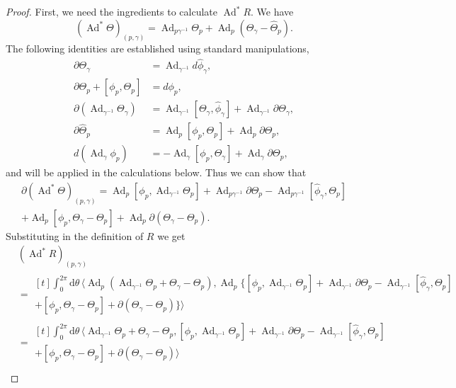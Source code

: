 \documentclass[12pt]{amsart}
\DeclareMathOperator{\Ad}{Ad}
\theoremstyle{plain}
\theoremstyle{definition}
\theoremstyle{remark}
\numberwithin{equation}{section}
\newcommand{\<}{\langle}
\renewcommand{\>}{\rangle}
\newcommand{\intSone}{\int_{0}^{2\pi}\mathrm{d}\theta\,}
\newcommand{\Thetahat}{\widehat{\Theta}}
\newcommand{\phihat}{\widehat{\phi}}
\begin{document}
\begin{proof}
First, we need the ingredients to calculate $\Ad^* R$. We have
\[
  (\Ad^*\Theta)_{(p,\gamma)} = \Ad_{p\gamma^{-1}}\Theta_p + \Ad_p(\Theta_\gamma - \Thetahat_p).
\]
The following identities are established using standard manipulations,
\begin{align*}
  \partial \Theta_\gamma & = \Ad_{\gamma^{-1}}d\phihat_\gamma, %
  \\
  \partial\Theta_p+[\phi_p,\Theta_p] &= d\phi_p, %
  \\
  \partial(\Ad_{\gamma^{-1}}\Theta_\gamma) &= \Ad_{\gamma^{-1}}[\Theta_\gamma,\phihat_\gamma] + \Ad_{\gamma^{-1}}\partial\Theta_\gamma, %
  \\
  \partial \Thetahat_p & = \Ad_p[\phi_p,\Theta_p] + \Ad_p \partial\Theta_p,%
  \\
  d(\Ad_\gamma\phi_p) & = -\Ad_\gamma[\phi_p,\Theta_\gamma] + \Ad_\gamma \partial\Theta_p,%
\end{align*}
and will be applied in the calculations below.
Thus we  can show that
\[
\begin{multlined}
\partial(\Ad^*\Theta)_{(p,\gamma)} = \Ad_p[\phi_p,\Ad_{\gamma^{-1}}\Theta_p] + \Ad_{p\gamma^{-1}}\partial\Theta_p - \Ad_{p\gamma^{-1}}[\phihat_\gamma,\Theta_p] \\+ \Ad_p[\phi_p,\Theta_\gamma-\Theta_p] + \Ad_p\partial(\Theta_\gamma-\Theta_p).
\end{multlined}
\]
Substituting in the definition of $R$ we get
\begin{align*}
&(\Ad^*R)_{(p,\gamma)} \\
&= \begin{multlined}[t]
  \intSone \langle \Ad_p(\Ad_{\gamma^{-1}}\Theta_p + \Theta_\gamma - \Theta_p),\Ad_p\big\{[\phi_p,\Ad_{\gamma^{-1}}\Theta_p] + \Ad_{\gamma^{-1}}\partial\Theta_p - \Ad_{\gamma^{-1}}[\phihat_\gamma,\Theta_p]\\
   + [\phi_p,\Theta_\gamma-\Theta_p] + \partial(\Theta_\gamma-\Theta_p)\big\}\rangle
\end{multlined}
\\
  &= \begin{multlined}[t]
  \intSone \langle \Ad_{\gamma^{-1}}\Theta_p + \Theta_\gamma - \Theta_p,[\phi_p,\Ad_{\gamma^{-1}}\Theta_p] + \Ad_{\gamma^{-1}}\partial\Theta_p - \Ad_{\gamma^{-1}}[\phihat_\gamma,\Theta_p] \\
    + [\phi_p,\Theta_\gamma-\Theta_p] + \partial(\Theta_\gamma-\Theta_p)\rangle\end{multlined}\\

\end{align*}
\end{proof}
\end{document}
